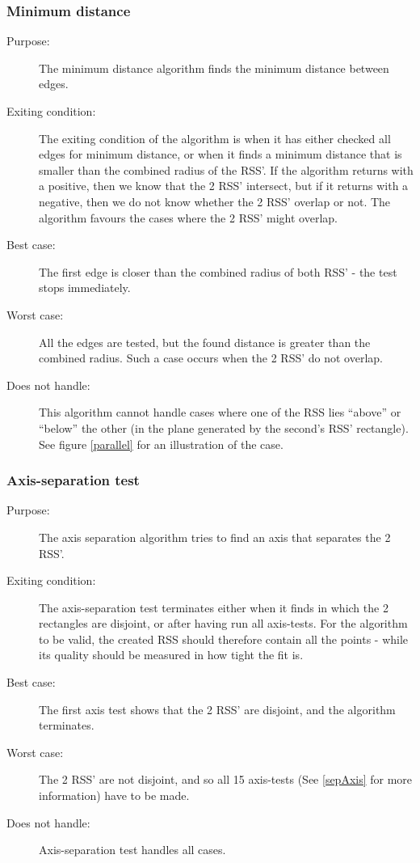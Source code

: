 \subsubsection{Minimum distance}
\begin{description}
\item[Purpose:] The minimum distance algorithm finds the minimum distance between edges.
\item[Exiting condition:]The exiting condition of the algorithm is when it has either checked all edges for minimum distance, or when it finds a minimum distance that is smaller than the combined radius of the RSS'. If the algorithm returns with a positive, then we know that the 2 RSS' intersect, but if it returns with a negative, then we do not know whether the 2 RSS' overlap or not. The algorithm favours the cases where the 2 RSS' might overlap.
\item[Best case:] The first edge is closer than the combined radius of both RSS' - the test stops immediately.
\item[Worst case:] All the edges are tested, but the found distance is greater than the combined radius. Such a case occurs when the 2 RSS' do not overlap.
\item[Does not handle:] This algorithm cannot handle cases where one of the RSS lies ``above'' or ``below'' the other (in the plane generated by the second's RSS' rectangle). See figure \ref{parallel} for an illustration of the case.
\end{description}

\subsubsection{Axis-separation test}
\begin{description}
\item[Purpose:] The axis separation algorithm tries to find an axis that separates the 2 RSS'. 
\item[Exiting condition:] The axis-separation test terminates either when it finds in which the 2 rectangles are disjoint, or after having run all axis-tests. For the algorithm to be valid, the created RSS should therefore contain all the points - while its quality should be measured in how tight the fit is.
\item[Best case:] The first axis test shows that the 2 RSS' are disjoint, and the algorithm terminates. 
\item[Worst case:] The 2 RSS' are not disjoint, and so all 15 axis-tests (See \ref{sepAxis} for more information) have to be made.
\item[Does not handle:] Axis-separation test handles all cases.
\end{description}

